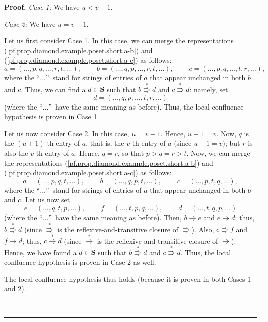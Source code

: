\documentclass[numbers=enddot,12pt,final,onecolumn,notitlepage]{scrartcl}%
\theoremstyle{definition}
\newenvironment{proof}[1][Proof]{\noindent\textbf{#1.} }{\ \rule{0.5em}{0.5em}}
\newenvironment{vershort}{}{}
\begin{document}
\begin{proof}
\begin{vershort}
\textit{Case 1:} We have $u<v-1$.

\textit{Case 2:} We have $u=v-1$.

Let us first consider Case 1. In this case, we can merge the representations
(\ref{pf.prop.diamond.example.poset.short.a-b}) and
(\ref{pf.prop.diamond.example.poset.short.a-c}) as follows:%
\[
a=\left(  \ldots,p,q,\ldots,r,t,\ldots\right)  ,\ \ \ \ \ \ \ \ \ \ b=\left(
\ldots,q,p,\ldots,r,t,\ldots\right)  ,\ \ \ \ \ \ \ \ \ \ c=\left(
\ldots,p,q,\ldots,t,r,\ldots\right)  ,
\]
where the \textquotedblleft$\ldots$\textquotedblright\ stand for strings of
entries of $a$ that appear unchanged in both $b$ and $c$. Thus, we can find a
$d\in\mathbf{S}$ such that $b\overset{\ast}{\Rrightarrow}d$ and
$c\overset{\ast}{\Rrightarrow}d$: namely, set%
\[
d=\left(  \ldots,q,p,\ldots,t,r,\ldots\right)
\]
(where the \textquotedblleft$\ldots$\textquotedblright\ have the same meaning
as before). Thus, the local confluence hypothesis is proven in Case 1.

Let us now consider Case 2. In this case, $u=v-1$. Hence, $u+1=v$. Now, $q$ is
the $\left(  u+1\right)  $-th entry of $a$, that is, the $v$-th entry of $a$
(since $u+1=v$); but $r$ is also the $v$-th entry of $a$. Hence, $q=r$, so
that $p>q=r>t$. Now, we can merge the representations
(\ref{pf.prop.diamond.example.poset.short.a-b}) and
(\ref{pf.prop.diamond.example.poset.short.a-c}) as follows:%
\[
a=\left(  \ldots,p,q,t,\ldots\right)  ,\ \ \ \ \ \ \ \ \ \ b=\left(
\ldots,q,p,t,\ldots\right)  ,\ \ \ \ \ \ \ \ \ \ c=\left(  \ldots
,p,t,q,\ldots\right)  ,
\]
where the \textquotedblleft$\ldots$\textquotedblright\ stand for strings of
entries of $a$ that appear unchanged in both $b$ and $c$. Let us now set%
\[
e=\left(  \ldots,q,t,p,\ldots\right)  ,\ \ \ \ \ \ \ \ \ \ f=\left(
\ldots,t,p,q,\ldots\right)  ,\ \ \ \ \ \ \ \ \ \ d=\left(  \ldots
,t,q,p,\ldots\right)
\]
(where the \textquotedblleft$\ldots$\textquotedblright\ have the same meaning
as before). Then, $b\Rrightarrow e$ and $e\Rrightarrow d$; thus,
$b\overset{\ast}{\Rrightarrow}d$ (since $\overset{\ast}{\Rrightarrow}$ is the
reflexive-and-transitive closure of $\Rrightarrow$). Also, $c\Rrightarrow f$
and $f\Rrightarrow d$; thus, $c\overset{\ast}{\Rrightarrow}d$ (since
$\overset{\ast}{\Rrightarrow}$ is the reflexive-and-transitive closure of
$\Rrightarrow$). Hence, we have found a $d\in\mathbf{S}$ such that
$b\overset{\ast}{\Rrightarrow}d$ and $c\overset{\ast}{\Rrightarrow}d$. Thus,
the local confluence hypothesis is proven in Case 2 as well.

The local confluence hypothesis thus holds (because it is proven in both Cases
1 and 2).
\end{vershort}


\end{proof}
\end{document}
